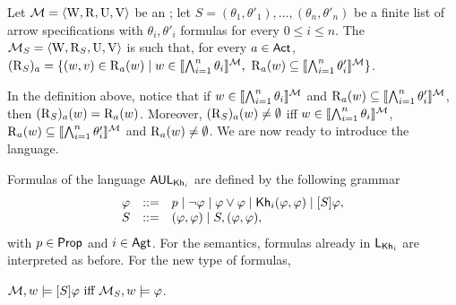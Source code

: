 \medskip 

\begin{definition}
Let $\mathcal{M} = \langle \operatorname{W}, \operatorname{R}, \operatorname{U}, \operatorname{V} \rangle$ be an \ults; let $S = (\theta_1,\theta'_1),\dots,(\theta_n,\theta'_n)$ be a finite list of arrow specifications with $\theta_i,\theta'_i$ formulas for every $0\leq i \leq n$. The \ults $\mathcal{M}_{{S}} = \langle \operatorname{W}, \operatorname{R}_{{S}}, \operatorname{U},\operatorname{V} \rangle$ is such that, for every $a\in{\rm \sf Act}$,
	$(\operatorname{R}_{{S}})_a = \{ (w,v) \in \operatorname{R}_a(w) \mid w \in \llbracket \bigwedge_{i=1}^n \theta_i \rrbracket^{\mathcal{M}} \text{, } \operatorname{R}_a(w) \subseteq \llbracket \bigwedge_{i=1}^n \theta'_i \rrbracket^{\mathcal{M}} \}$.
\end{definition}

\medskip

In the definition above, notice that if $w \in \llbracket \bigwedge_{i=1}^n \theta_i \rrbracket^{\mathcal{M}}$ and $\operatorname{R}_a(w) \subseteq \llbracket \bigwedge_{i=1}^n \theta'_i \rrbracket^{\mathcal{M}}$, then $(\operatorname{R}_{{S}})_a(w) = \operatorname{R}_a(w)$. Moreover, $(\operatorname{R}_{{S}})_a(w) \neq \emptyset$ iff $w \in \llbracket \bigwedge_{i=1}^n \theta_i \rrbracket^{\mathcal{M}}$, $\operatorname{R}_a(w) \subseteq \llbracket \bigwedge_{i=1}^n \theta'_i \rrbracket^{\mathcal{M}}$ and $\operatorname{R}_a(w) \neq \emptyset$.
We are now ready to introduce the language.

\medskip

\begin{definition}\label{def:arrowsyntax}\label{def:arrowupdate}
Formulas of the language $\mathsf{AUL}_{{\sf Kh}_i}$ are defined by the following grammar
\[
\begin{array}{lcl}
\varphi & ::= & p \mid \neg\varphi \mid \varphi\vee\varphi \mid
{\sf Kh}_i(\varphi,\varphi) \mid [S]\varphi, \\
S & ::= & (\varphi,\varphi) \mid S,(\varphi,\varphi),
\end{array}
\]
with $p \in {\rm \sf Prop}$ and $i\in{\rm \sf Agt}$. 
For the semantics, formulas already in $\mathsf{L}_{{\sf Kh}_i}$ are interpreted as before. For the new type of formulas, 
\begin{spcenter}
	$\mathcal{M},w \models [S]\varphi \mbox{ iff } \mathcal{M}_{{S}},w \models \varphi$.
\end{spcenter}
\end{definition}

